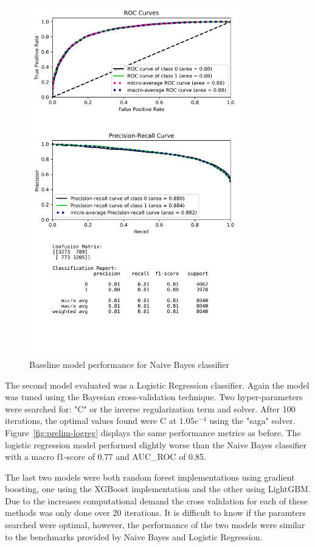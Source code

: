 \documentclass[journal,twoside,web]{ieeecolor}
\begin{document}
\begin{figure}[h!]
  \centering
  \includegraphics[width=3.6in]{project/code/preliminary-naivebayes-downsampled.png}
  \caption{Baseline model performance for Naive Bayes classifier}
  \label{fig:prelim-NB}
\end{figure}

The second model evaluated was a Logistic Regression classifier. Again the model was tuned using the Bayesian cross-validation technique. Two hyper-parameters were searched for: "C" or the inverse regularization term and solver. After 100 iterations, the optimal values found were C at $1.05e^{-4}$  using the "saga" solver. Figure~\ref{fig:prelim-logreg} displays the same performance metrics as before. The logistic regression model performed slightly worse than the Naive Bayes classifier with a macro f1-score of 0.77 and AUC\_ROC of 0.85. 

The last two models were both random forest implementations using gradient boosting, one using the XGBoost implementation and the other using LightGBM. Due to the increases computational demand the cross validation for each of these methods was only done over 20 iterations. It is difficult to know if the paramters searched were optimal, however, the performance of the two models were similar to the benchmarks provided by Naive Bayes and Logistic Regression.
\end{document}
